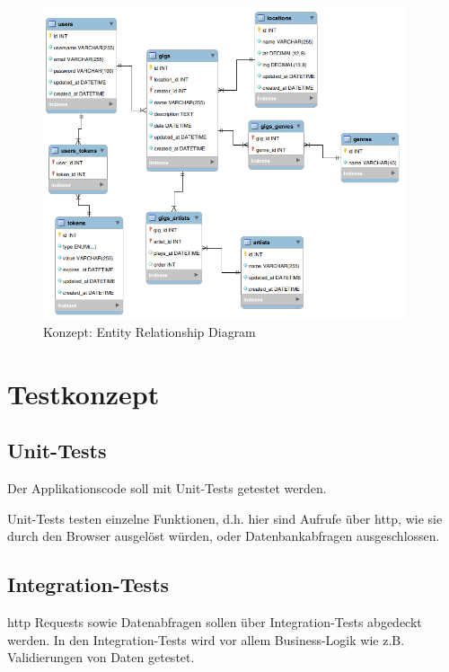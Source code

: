 \begin{figure}[!htb]
  \centering
  \includegraphics[width=0.95\textwidth]{konzept/erd.png}
  \caption{Konzept: Entity Relationship Diagram}
\end{figure}


\clearpage
\section{Testkonzept}\label{testkonzept}

\subsection{Unit-Tests}\label{unittests}

Der Applikationscode soll mit Unit-Tests getestet werden.

Unit-Tests testen einzelne Funktionen, d.h. hier sind Aufrufe über \Gls{http}, wie
sie durch den Browser ausgelöst würden, oder Datenbankabfragen ausgeschlossen.

\subsection{Integration-Tests}\label{integrationtests}

\Gls{http} Requests sowie Datenabfragen sollen über Integration-Tests abgedeckt
werden. In den Integration-Tests wird vor allem Business-Logik wie z.B.
Validierungen von Daten getestet.

